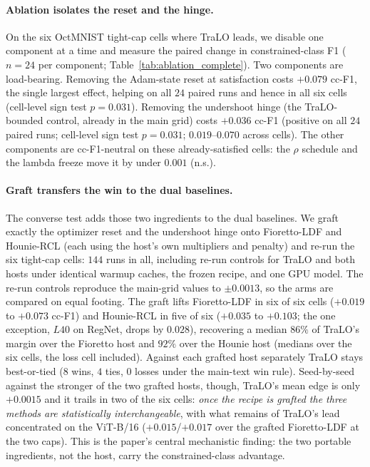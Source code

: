 \documentclass[10pt]{article}
\begin{document}
\paragraph{Ablation isolates the reset and the hinge.}
On the six OctMNIST tight-cap cells where TraLO leads, we disable one
component at a time and measure the paired change in constrained-class F1
($n{=}24$ per component; Table~\ref{tab:ablation_complete}). Two
components are load-bearing. Removing the Adam-state reset at satisfaction
costs $+0.079$ cc-F1, the single largest effect, helping on all $24$
paired runs and hence in all six cells (cell-level sign test $p\!=\!0.031$).
Removing the undershoot hinge (the TraLO-bounded control, already in the
main grid) costs $+0.036$ cc-F1 (positive on all $24$ paired runs;
cell-level sign test $p\!=\!0.031$; $0.019$--$0.070$ across cells). The
other components are cc-F1-neutral on these already-satisfied cells: the
$\rho$ schedule and the lambda freeze move it by under $0.001$ (n.s.).

\paragraph{Graft transfers the win to the dual baselines.}
The converse test adds those two ingredients to the dual baselines. We
graft exactly the optimizer reset and the undershoot hinge onto
Fioretto-LDF and Hounie-RCL (each using the host's own multipliers and
penalty) and re-run the six tight-cap cells: $144$ runs in all, including
re-run controls for TraLO and both hosts under identical warmup caches,
the frozen recipe, and one GPU model. The re-run controls reproduce the
main-grid values to $\pm0.0013$, so the arms are compared on equal
footing. The graft lifts Fioretto-LDF in six of six cells ($+0.019$ to
$+0.073$ cc-F1) and Hounie-RCL in five of six ($+0.035$ to $+0.103$; the
one exception, $L40$ on RegNet, drops by $0.028$), recovering a median
$86\%$ of TraLO's margin over the Fioretto host and $92\%$ over the
Hounie host (medians over the six cells, the loss cell included). Against
each grafted host separately TraLO stays best-or-tied ($8$ wins, $4$
ties, $0$ losses under the main-text win rule). Seed-by-seed against the
stronger of the two grafted hosts, though, TraLO's mean edge is only
$+0.0015$ and it trails in two of the six cells: \emph{once the recipe is
grafted the three methods are statistically interchangeable}, with what
remains of TraLO's lead concentrated on the ViT-B/16 ($+0.015$/$+0.017$
over the grafted Fioretto-LDF at the two caps). This is the paper's
central mechanistic finding: the two portable ingredients, not the host,
carry the constrained-class advantage.
\end{document}
